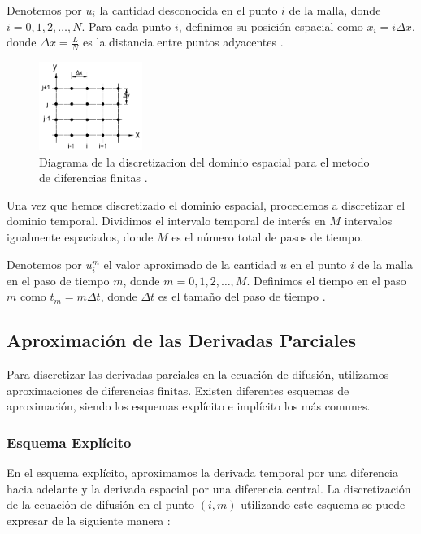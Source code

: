 \documentclass{article}
\begin{document}
Denotemos por \(u_i\) la cantidad desconocida en el punto \(i\) de la malla, donde \(i = 0, 1, 2, \ldots, N\). Para cada punto \(i\), definimos su posición espacial como \(x_i = i \Delta x\), donde \(\Delta x = \frac{L}{N}\) es la distancia entre puntos adyacentes \cite{difusion_diferencias_finitas}.

\begin{figure}[H]
    \centering
   \includegraphics[width=0.3\textwidth]{Discretizacion_dominio_espacial.png}
    \caption{Diagrama de la discretizacion del dominio espacial para el metodo de diferencias finitas \cite{diagrama_discretizacion}.}
    \label{fig:discretizacion_espacial}
\end{figure}

Una vez que hemos discretizado el dominio espacial, procedemos a discretizar el dominio temporal. Dividimos el intervalo temporal de interés en \(M\) intervalos igualmente espaciados, donde \(M\) es el número total de pasos de tiempo.

Denotemos por \(u_i^m\) el valor aproximado de la cantidad \(u\) en el punto \(i\) de la malla en el paso de tiempo \(m\), donde \(m = 0, 1, 2, \ldots, M\). Definimos el tiempo en el paso \(m\) como \(t_m = m \Delta t\), donde \(\Delta t\) es el tamaño del paso de tiempo \cite{difusion_diferencias_finitas}.

\subsection{Aproximación de las Derivadas Parciales}

Para discretizar las derivadas parciales en la ecuación de difusión, utilizamos aproximaciones de diferencias finitas. Existen diferentes esquemas de aproximación, siendo los esquemas explícito e implícito los más comunes.

\subsubsection{Esquema Explícito}
En el esquema explícito, aproximamos la derivada temporal por una diferencia hacia adelante y la derivada espacial por una diferencia central. La discretización de la ecuación de difusión en el punto \((i,m)\) utilizando este esquema se puede expresar de la siguiente manera \cite{difusion_diferencias_finitas}:
\end{document}
